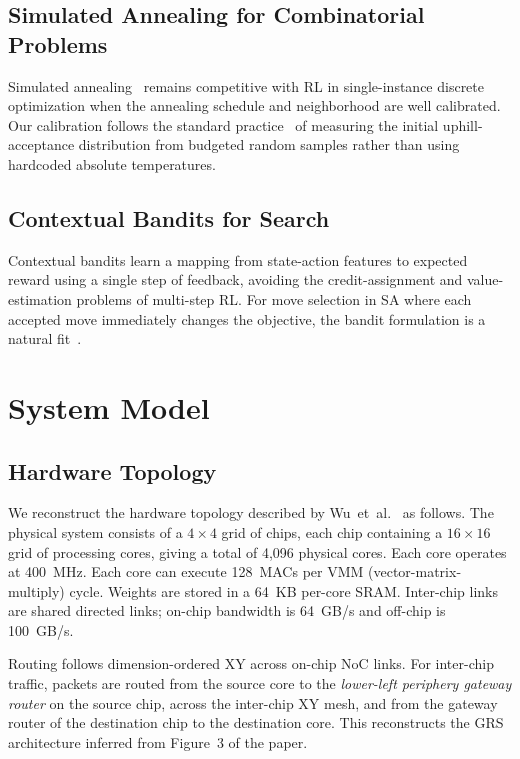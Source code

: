 \documentclass[10pt,conference]{IEEEtran}
\begin{document}
\subsection{Simulated Annealing for Combinatorial Problems}

Simulated annealing~\cite{kirkpatrick1983sa} remains competitive with RL in
single-instance discrete optimization when the annealing schedule and
neighborhood are well calibrated.  Our calibration follows the standard
practice~\cite{bohachevsky1986sa} of measuring the initial uphill-acceptance
distribution from budgeted random samples rather than using hardcoded absolute
temperatures.

\subsection{Contextual Bandits for Search}

Contextual bandits learn a mapping from state-action features to expected
reward using a single step of feedback, avoiding the credit-assignment and value-
estimation problems of multi-step RL.  For move selection in SA where each
accepted move immediately changes the objective, the bandit formulation is a
natural fit~\cite{lattimore2020bandit}.

\section{System Model}
\label{sec:system}

\subsection{Hardware Topology}

We reconstruct the hardware topology described by Wu~et~al.~\cite{wu2020todaes}
as follows.  The physical system consists of a $4{\times}4$ grid of chips, each
chip containing a $16{\times}16$ grid of processing cores, giving a total of
4,096 physical cores.  Each core operates at 400~MHz.  Each core can execute
128~MACs per VMM (vector-matrix-multiply) cycle.  Weights are stored in a 64~KB
per-core SRAM.  Inter-chip links are shared directed links; on-chip bandwidth is
64~GB/s and off-chip is 100~GB/s.

Routing follows dimension-ordered XY across on-chip NoC links.  For inter-chip
traffic, packets are routed from the source core to the \emph{lower-left
periphery gateway router} on the source chip, across the inter-chip XY mesh,
and from the gateway router of the destination chip to the destination core.
This reconstructs the GRS architecture inferred from Figure~3 of the paper.
\end{document}

